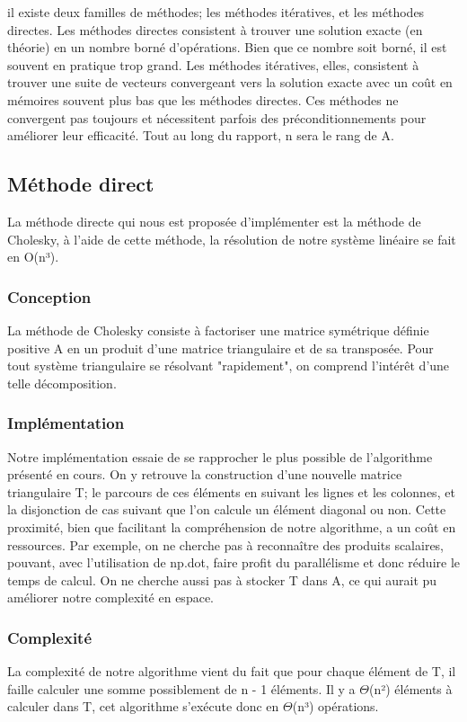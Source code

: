 \documentclass{article}
\begin{document}
il existe deux familles de méthodes; les méthodes itératives, et les méthodes directes.
Les méthodes directes consistent à trouver une solution exacte (en théorie) en un nombre borné d'opérations. Bien que ce nombre soit borné, il est souvent en pratique trop grand. 
Les méthodes itératives, elles, consistent à trouver une suite de vecteurs convergeant vers la solution exacte avec un coût en mémoires souvent plus bas que les méthodes directes. Ces méthodes ne convergent pas toujours et nécessitent parfois des préconditionnements pour améliorer leur efficacité.
Tout au long du rapport, n sera le rang de A.
\subsection*{Méthode direct}
La méthode directe qui nous est proposée d'implémenter est la méthode de Cholesky, à l'aide de cette méthode, la résolution de notre système linéaire se fait en O(n³).
\subsubsection{Conception}
La méthode de Cholesky consiste à factoriser une matrice symétrique définie positive A en un produit d'une matrice triangulaire et de sa transposée. Pour tout système triangulaire se résolvant "rapidement", on comprend l’intérêt d'une telle décomposition.
\subsubsection*{Implémentation}
Notre implémentation essaie de se rapprocher le plus possible de l'algorithme présenté en cours. On y retrouve la construction d'une nouvelle matrice triangulaire T; le parcours de ces éléments en suivant les lignes et les colonnes, et la disjonction de cas suivant que l'on calcule un élément diagonal ou non.
Cette proximité, bien que facilitant la compréhension de notre algorithme, a un coût en ressources.
Par exemple, on ne cherche pas à reconnaître des produits scalaires, pouvant, avec l'utilisation de np.dot, faire profit du parallélisme et donc réduire le temps de calcul.
On ne cherche aussi pas à stocker T dans A, ce qui aurait pu améliorer notre complexité en espace.
\subsubsection*{Complexité}
La complexité de notre algorithme vient du fait que pour chaque élément de T, il faille calculer une somme possiblement de n - 1 éléments.
Il y a \( \Theta \)(n²) éléments à calculer dans T, cet algorithme s’exécute donc en \( \Theta \)(n³) opérations.
\end{document}
